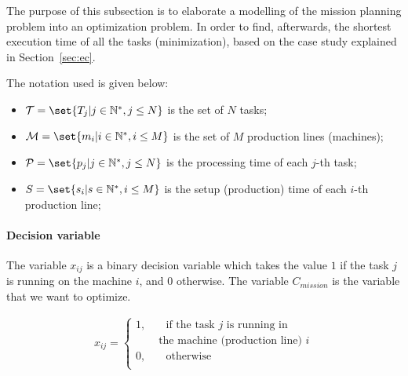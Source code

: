 \documentclass[conference,harvard,brazil,english]{sbatex}
\begin{document}
The purpose of this subsection is to elaborate a modelling of the mission planning problem into an optimization problem. In order to find, afterwards, the shortest execution time of all the tasks (minimization), based on the case study explained in Section~\ref{sec:ec}.

The notation used is given below:

\begin{itemize}
\item $\mathcal{T} = \set{T_j \vert j\in \mathbb{N}^{*},j\leq N}$ is the set of $N$ tasks;
\item $\mathcal{M} = \set{m_i \vert i\in \mathbb{N}^{*},i\leq M}$ is the set of $M$ production lines (machines);
\item $\mathcal{P} = \set{p_j \vert j\in \mathbb{N}^{*},j\leq N}$ is the processing time of each $j$-th task;
\item $S = \set{s_i \vert s\in \mathbb{N}^{*},i\leq M}$  is the setup (production) time of each $i$-th production line;
\end{itemize}

\paragraph{Decision variable}

The variable $x_{ij}$ is a binary decision variable which takes the value $1$ if the task $j$ is running on the machine $i$, and $0$ otherwise. The variable $C_ {mission}$ is the variable that we want to optimize.

\begin{equation}
\label{eq:decision}
\begin{split}
x_{ij}=\begin{cases}
    1,       & \quad \text{if the task } j \text{ is running in} \\
 &\text{ the machine (production line) }i\\
    0,  & \quad \text{otherwise}\\
  \end{cases}
\end{split}
\end{equation}
\end{document}
